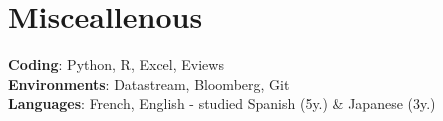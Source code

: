 \documentclass[letterpaper,10pt]{article}
\makeatletter
\newcommand{\up}[1]{\textsuperscript{#1}}
\newcommand{\resumeItem}[1]{
    \item\small{
            {#1 \vspace{-2pt}}
    }
}
\newcommand{\resumeSubheading}[4]{
    \vspace{-2pt}\item
    \begin{tabular*}{0.97\textwidth}[t]{l@{\extracolsep{\fill}}r}
        \textbf{#1}       & #2                 \\
        \textit{\small#3} & \textit{\small #4} \\
    \end{tabular*}\vspace{-7pt}
}
\newcommand{\resumeSubHeadingListStart}{\begin{itemize}[leftmargin=0.15in, label={}]}
\newcommand{\resumeSubHeadingListEnd}{\end{itemize}}
\newcommand{\resumeItemListStart}{\begin{itemize}}
\newcommand{\resumeItemListEnd}{\end{itemize}\vspace{-5pt}}
\makeatother
\begin{document}
\section{Misceallenous}
\begin{itemize}[leftmargin=0.15in, label={}]
\small{\item{
\textbf{Coding}{: Python, R, Excel, Eviews} \\
\textbf{Environments}{: Datastream, Bloomberg, Git}\\
\textbf{Languages}{: French, English - studied Spanish (5y.) \& Japanese (3y.)} \\

}}
\end{itemize}
\end{document}
